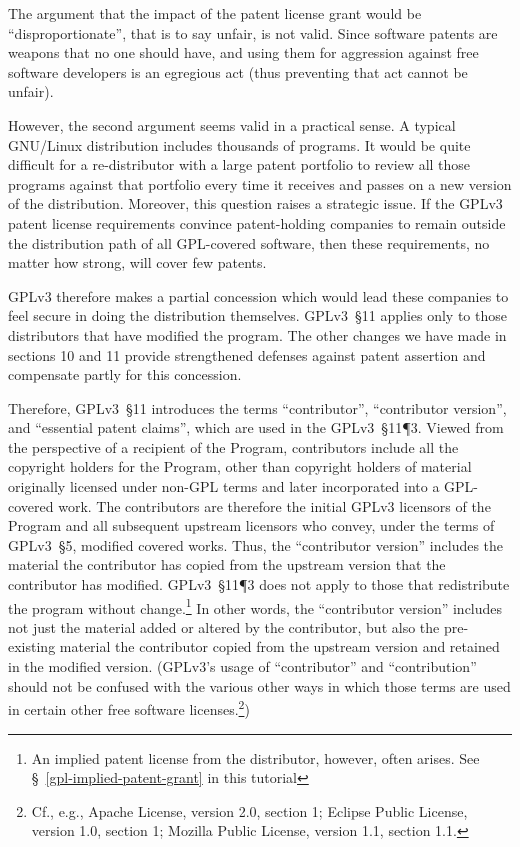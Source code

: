 The argument that the impact of the patent license grant would be
``disproportionate'',  that is to say unfair, is not valid. Since
software patents are weapons that no one should have, and using them for
aggression against free software developers is an egregious act (thus
preventing that act cannot be unfair). 

However, the second argument seems valid in a practical sense.  A
typical GNU/Linux distribution includes thousands of programs.  It would
be quite difficult for a re-distributor with a large patent portfolio to
review all those programs against that portfolio every time it receives
and passes on a new version of the distribution.  Moreover, this question
raises a strategic issue. If the GPLv3 patent license requirements
convince patent-holding companies to remain outside the distribution
path of all GPL-covered software, then these requirements, no matter how
strong, will cover few patents. 

GPLv3 therefore makes a partial concession
which would lead these companies to feel secure in doing the
distribution themselves. GPLv3~\S11
applies only to those distributors that have
modified the program.  The other changes we have made in sections 10 and
11 provide strengthened defenses against patent assertion and compensate
partly for this concession. 

Therefore, GPLv3~\S11 introduces the terms ``contributor'', ``contributor version'', and
``essential patent claims'', which are
used in the GPLv3~\S11\P3.   Viewed from the perspective of a recipient of the
Program, contributors include all the copyright holders for the Program,
other than copyright holders of material originally licensed under non-GPL
terms and later incorporated into a GPL-covered work.  The contributors are
therefore the initial GPLv3 licensors of the Program and all subsequent
upstream licensors who convey, under the terms of GPLv3~\S5, modified covered
works.
Thus, the ``contributor version'' includes the material the contributor has copied from the
upstream version that the contributor has modified.  GPLv3~\S11\P3
 does not apply to those that redistribute the program
without change.\footnote{An implied patent license from the distributor,
however, often arises.  See \S~\ref{gpl-implied-patent-grant} in this tutorial}
In other words, the ``contributor version'' includes not just
the material added or altered by the contributor, but also the pre-existing
material the contributor copied from the upstream version and retained in the
modified version.  (GPLv3's usage of ``contributor'' and ``contribution'' should
not be confused with the various other ways in which those terms are used in
certain other free software licenses.\footnote{Cf., e.g., Apache License,
  version 2.0, section 1; Eclipse Public License, version 1.0, section 1;
  Mozilla Public License, version 1.1, section 1.1.})

